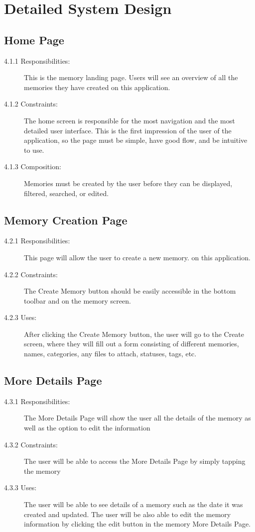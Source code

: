 \documentclass{article}
\begin{document}
\section{Detailed System Design}
\subsection{Home Page}
\begin{description}
\item[4.1.1 Responsibilities:] This is the memory landing page. Users will see an overview of all the memories they have created
on this application.
\item[4.1.2 Constraints:] The home screen is responsible for the most navigation and the most detailed user
interface. This is the first impression of the user of the application, so the page must be simple, have
good flow, and be intuitive to use.
\item[4.1.3 Composition:] Memories must be created by the user before they can be displayed, filtered, searched, or edited.
\end{description}

\subsection{Memory Creation Page}
\begin{description}
\item[4.2.1 Responsibilities:] This page will allow the user to create a new memory.
on this application.
\item[4.2.2 Constraints:] The Create Memory button should be easily accessible in the bottom toolbar and on the memory screen.
\item[4.2.3 Uses:] After clicking the Create Memory button, the user will go to the Create screen, where they will fill out a form consisting of different memories, names, categories, any files to
attach, statuses, tags, etc.
\end{description}

\subsection{More Details Page}
\begin{description}
\item[4.3.1 Responsibilities:] The More Details Page will show the user all the details of the memory as well as the option to edit the information
\item[4.3.2 Constraints:] The user will be able to access the More Details Page by simply tapping the memory
\item[4.3.3 Uses:] The user will be able to see details of a memory such as the date it was created and updated. The user will be also able to edit the memory information by clicking the edit button in the memory More Details Page.
\end{description}
\end{document}
